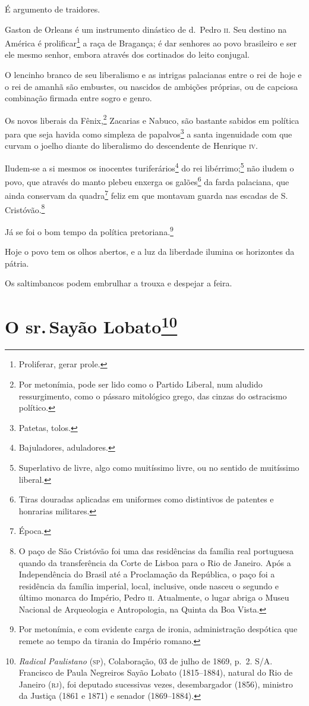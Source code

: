 É argumento de traidores.

Gaston de Orleans é um instrumento dinástico de d.~Pedro \textsc{ii}. Seu destino
na América é prolificar\footnote{Proliferar, gerar prole.} a raça de
Bragança; é dar senhores ao povo brasileiro e ser ele mesmo senhor,
embora através dos cortinados do leito conjugal.

O lencinho branco de seu liberalismo e as intrigas palacianas entre o
rei de hoje e o rei de amanhã são embustes, ou nascidos de ambições
próprias, ou de capciosa combinação firmada entre sogro e genro.

Os novos liberais da Fênix,\footnote{Por metonímia, pode ser lido como
  o Partido Liberal, num aludido ressurgimento, como o pássaro
  mitológico grego, das cinzas do ostracismo político.} Zacarias e
Nabuco, são bastante sabidos em política para que seja havida como
simpleza de papalvos\footnote{Patetas, tolos.} a santa ingenuidade com
que curvam o joelho diante do liberalismo do descendente de Henrique \textsc{iv}.

Iludem-se a si mesmos os inocentes turiferários\footnote{Bajuladores,
  aduladores.} do rei libérrimo;\footnote{Superlativo de livre, algo
  como muitíssimo livre, ou no sentido de muitíssimo liberal.} não
iludem o povo, que através do manto plebeu enxerga os galões\footnote{
  Tiras douradas aplicadas em uniformes como distintivos de patentes e
  honrarias militares.} da farda palaciana, que ainda conservam da
quadra\footnote{Época.} feliz em que montavam guarda nas escadas de S.
Cristóvão.\footnote{O paço de São Cristóvão foi uma das residências da
  família real portuguesa quando da transferência da Corte de Lisboa
  para o Rio de Janeiro. Após a Independência do Brasil até a
  Proclamação da República, o paço foi a residência da família imperial,
  local, inclusive, onde nasceu o segundo e último monarca do Império,
  Pedro \textsc{ii}. Atualmente, o lugar abriga o Museu Nacional de Arqueologia e
  Antropologia, na Quinta da Boa Vista.}

Já se foi o bom tempo da política pretoriana.\footnote{Por metonímia, e
  com evidente carga de ironia, administração despótica que remete ao
  tempo da tirania do Império romano.}

Hoje o povo tem os olhos abertos, e a luz da liberdade ilumina os
horizontes da pátria.

Os saltimbancos podem embrulhar a trouxa e despejar a feira.

\chapter{O sr.\,Sayão Lobato\footnote{\emph{Radical Paulistano} (\textsc{sp}),
  Colaboração, 03 de julho de 1869, p.~2. S/A. Francisco de Paula Negreiros Sayão
  Lobato (1815--1884), natural do Rio de Janeiro (\textsc{rj}), foi deputado
  sucessivas vezes, desembargador (1856), ministro da Justiça (1861 e
  1871) e senador (1869--1884).}}

